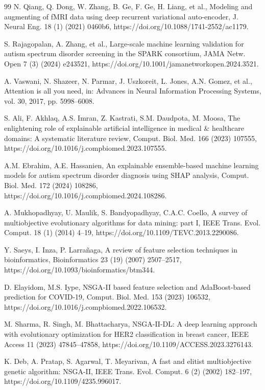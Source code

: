 \documentclass[pdflatex,sn-vancouver-num]{sn-jnl}
\begin{document}
\begin{thebibliography}{99}
N. Qiang, Q. Dong, W. Zhang, B. Ge, F. Ge, H. Liang, et al., Modeling and augmenting of fMRI data using deep recurrent variational auto-encoder, J. Neural Eng. 18 (1) (2021) 0460b6, https://doi.org/10.1088/1741-2552/ac1179.

S. Rajagopalan, A. Zhang, et al., Large-scale machine learning validation for autism spectrum disorder screening in the SPARK consortium, JAMA Netw. Open 7 (3) (2024) e243521, https://doi.org/10.1001/jamanetworkopen.2024.3521.

A. Vaswani, N. Shazeer, N. Parmar, J. Uszkoreit, L. Jones, A.N. Gomez, et al., Attention is all you need, in: Advances in Neural Information Processing Systems, vol. 30, 2017, pp. 5998--6008.

S. Ali, F. Akhlaq, A.S. Imran, Z. Kastrati, S.M. Daudpota, M. Moosa, The enlightening role of explainable artificial intelligence in medical \& healthcare domains: A systematic literature review, Comput. Biol. Med. 166 (2023) 107555, https://doi.org/10.1016/j.compbiomed.2023.107555.

A.M. Ebrahim, A.E. Hassanien, An explainable ensemble-based machine learning models for autism spectrum disorder diagnosis using SHAP analysis, Comput. Biol. Med. 172 (2024) 108286, https://doi.org/10.1016/j.compbiomed.2024.108286.

A. Mukhopadhyay, U. Maulik, S. Bandyopadhyay, C.A.C. Coello, A survey of multiobjective evolutionary algorithms for data mining: part I, IEEE Trans. Evol. Comput. 18 (1) (2014) 4--19, https://doi.org/10.1109/TEVC.2013.2290086.

Y. Saeys, I. Inza, P. Larra{\~n}aga, A review of feature selection techniques in bioinformatics, Bioinformatics 23 (19) (2007) 2507--2517, https://doi.org/10.1093/bioinformatics/btm344.

D. Elayidom, M.S. Iype, NSGA-II based feature selection and AdaBoost-based prediction for COVID-19, Comput. Biol. Med. 153 (2023) 106532, https://doi.org/10.1016/j.compbiomed.2022.106532.

M. Sharma, R. Singh, M. Bhattacharya, NSGA-II-DL: A deep learning approach with evolutionary optimization for HER2 classification in breast cancer, IEEE Access 11 (2023) 47845--47858, https://doi.org/10.1109/ACCESS.2023.3276143.

K. Deb, A. Pratap, S. Agarwal, T. Meyarivan, A fast and elitist multiobjective genetic algorithm: NSGA-II, IEEE Trans. Evol. Comput. 6 (2) (2002) 182--197, https://doi.org/10.1109/4235.996017.


\end{thebibliography}
\end{document}
